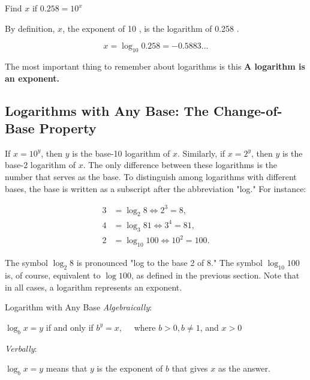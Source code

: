 \begin{example} Find $x$ if $0.258=10^x$

\begin{solution}
   By definition, $x$, the exponent of 10 , is the logarithm of 0.258 .

    \[
    x=\log_{10} 0.258=-0.5883 \ldots
    \]
\end{solution}
    
\end{example}

\begin{custombox}{The most important thing to remember about logarithms is this}
    \textbf{A logarithm is an exponent.}
\end{custombox}

\subsection*{Logarithms with Any Base: The Change-of-Base Property}
If \(x = 10^y\), then \(y\) is the base-10 logarithm of \(x\). Similarly, if \(x = 2^y\), then \(y\) is the base-2 logarithm of \(x\). The only difference between these logarithms is the number that serves as the base. To distinguish among logarithms with different bases, the base is written as a subscript after the abbreviation "log." For instance:

\[
\begin{aligned}
3 &= \log_2 8 \Leftrightarrow 2^3 = 8, \\
4 &= \log_3 81 \Leftrightarrow 3^4 = 81, \\
2 &= \log_{10} 100 \Leftrightarrow 10^2 = 100.
\end{aligned}
\]

The symbol \(\log_2 8\) is pronounced "log to the base 2 of 8." The symbol \(\log_{10} 100\) is, of course, equivalent to \(\log 100\), as defined in the previous section. Note that in all cases, a logarithm represents an exponent.

\begin{definition}{Logarithm with Any Base}
\textit{Algebraically}:

\hspace{1cm}$\log _b x=y$ if and only if $b^y=x, \quad$ where $b>0, b \neq 1$, and $x>0$

\vspace{0.3cm}

\textit{Verbally}:

\hspace{1cm} $\log _b x=y$ means that $y$ is the exponent of $b$ that gives $x$ as the answer.
    
\end{definition}

